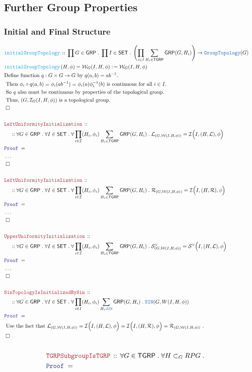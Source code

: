 \documentclass[12pt]{scrartcl}
\newcommand{\TYPE}[1]{\textcolor{NavyBlue}{\mathtt{#1}}}
\newcommand{\FUNC}[1]{\textcolor{Cerulean}{\mathtt{#1}}}
\newcommand{\LOGIC}[1]{\textcolor{Blue}{\mathtt{#1}}}
\newcommand{\THM}[1]{\textcolor{Maroon}{\mathtt{#1}}}
\renewcommand{\.}{\; . \;}
\newcommand{\de}{: \kern 0.1pc =}
\newcommand{\Act}[1]{\left( #1 \right)}
\newcommand{\Theorem}[2]{& \THM{#1} \, :: \, #2 \\ & \Proof = \\ }
\newcommand{\DeclareFunc}[2]{& \FUNC{#1} \, :: \, #2 \\}
\newcommand{\DefineNamedFunc}[4]{&  \FUNC{#1}\Act{#2} = #3 \de #4 \\}
\newcommand{\NewLine}{\\ & \kern 1pc}
\newcommand{\Page}[1]{ \begin{align*} #1 \end{align*}   }
\newcommand{\NoProof}{ & \ldots \\ \EndProof}
\newcommand{\Explain}[1]{& \text{#1.} \\}
\newcommand{\QED}{\; \square}
\newcommand{\EndProof}{& \QED \\}
\newcommand{\Proof}{\LOGIC{Proof} \; }
\newcommand{\I}{\mathcal{I}}
\newcommand{\R}{\mathrm{R}}
\newcommand{\SET}{\mathsf{SET}}
\newcommand{\Top}{\TYPE{Topology}}
\renewcommand{\L}{\mathcal{L}}
\renewcommand{\S}{\mathcal{S}}
\newcommand{\Group}{\TYPE{Group}}
\newcommand{\GRP}{\mathsf{GRP}}
\newcommand{\SIN}{\TYPE{SIN}}
\newcommand{\TGRP}{\mathsf{TGRP}}
\newcommand{\W}{\mathcal{W}}
\renewcommand{\L}{\mathcal{L}}
\renewcommand{\R}{\mathcal{R}}
\renewcommand{\S}{\mathcal{S}}
\begin{document}
\subsection{Further Group Properties}
 \subsubsection{Initial and Final  Structure} 
 \Page{ 		
 		\DeclareFunc{initialGroupTopology}
 		{
 			\prod G \in \GRP \. 
 			\prod  I \in \SET \.
 			\left( \prod_{i \in I} \sum_{H _i\in \TGRP} \GRP(G,H_i)  \right) \to \Group\Top(G) 
 		}
 		\DefineNamedFunc{initialGroupTopology}{H,\phi}{\W_G(I,H,\phi)}{\W_G(I,H,\phi)}
 		\Explain{Define function 
 			$q : G\times G \to G$ by $q(a,b) = ab^{-1}$}
 		\Explain{
 			Then $\phi_i \circ q(a,b) = \phi_i(ab^{-1}) = \phi_i(a)\phi^{-1}_i(b)$ 
 			is continuous for all $i \in I$}
 		\Explain{
 			So $q$ also must be continuous by properties of the topological group}
 		\Explain{  
 			Thus, $(G,\I_G(I,H,\phi))$ is a topological group}
 		\EndProof
 		\\
 		\Theorem{LeftUniformityInitialization}
 		{
			\NewLine :: 			
 			\forall G \in \GRP \.
 			\forall I \in \SET \.
 			\forall \prod_{i \in \I} (H_i,\phi_i) \sum_{H_i \in \TGRP} \GRP(G,H_i) \.
 			\L_{(G,\W(I,H,\phi))} = \I\Big(I,(H,\L),\phi\Big)
 		}
 		\NoProof
 		\\
 		\Theorem{LeftUniformityInitialization}
 		{
			\NewLine :: 			
 			\forall G \in \GRP \.
 			\forall I \in \SET \.
 			\forall \prod_{i \in \I} (H_i,\phi_i) \sum_{H_i \in \TGRP} \GRP(G,H_i) \.
 			\R_{(G,\W(I,H,\phi))} = \I\Big(I,(H,\R),\phi\Big)
 		}
 		\NoProof
 		\\
 		\Theorem{UpperUniformityInitialization}
 		{
			\NewLine :: 			
 			\forall G \in \GRP \.
 			\forall I \in \SET \.
 			\forall \prod_{i \in \I} (H_i,\phi_i) \sum_{H_i \in \TGRP} \GRP(G,H_i) \.
 			\S^\vee_{(G,\W(I,H,\phi))} = \S^\vee\Big(I,(H,\L),\phi\Big)
 		}
 		\NoProof
 		\\
 		\Theorem{SinTopologyIsInitializedBySin}
 		{
 			\NewLine ::
 			\forall G \in \GRP \.
 			\forall I \in \SET \. 
 			\forall \prod_{i \in I} (H_i,\phi_i) \sum_{H_i : \SIN} \GRP(G,H_i) \.
 			\SIN(G,W(I,H,\phi))
 		}
 		\Explain{
 			Use the fact that
 			$
 				\L_{(G,\W(I,H,\phi))} = \I\Big(I,(H,\L),\phi\Big) =
 				\I\Big(I,(H,\R),\phi\Big) = \R_{(G,\W(I,H,\phi))}
 			$ 
 		}
 		\EndProof
 		\\
 }\Page{
 	\Theorem{TGRPSubgroupIsTGRP}
 	{
 		\forall G \in \TGRP \.
 		\forall H \subset_GRP  G \.
}}
\end{document}
